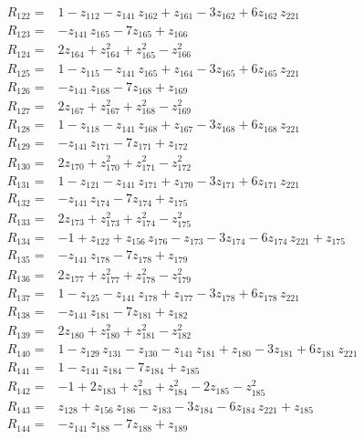 \documentclass[11pt]{article}
\theoremstyle{remark}\newtheorem{remark}[theorem]{Remark}
\begin{document}
\begin{align*}
R_{122}={}& 1 - z_{112} - z_{141}\,z_{162} + z_{161} - 3z_{162} + 6z_{162}\,z_{221} \\[2pt]
R_{123}={}& -z_{141}\,z_{165} - 7z_{165} + z_{166} \\[2pt]
R_{124}={}& 2z_{164} + z_{164}^{2} + z_{165}^{2} - z_{166}^{2} \\[2pt]
R_{125}={}& 1 - z_{115} - z_{141}\,z_{165} + z_{164} - 3z_{165} + 6z_{165}\,z_{221} \\[2pt]
R_{126}={}& -z_{141}\,z_{168} - 7z_{168} + z_{169} \\[2pt]
R_{127}={}& 2z_{167} + z_{167}^{2} + z_{168}^{2} - z_{169}^{2} \\[2pt]
R_{128}={}& 1 - z_{118} - z_{141}\,z_{168} + z_{167} - 3z_{168} + 6z_{168}\,z_{221} \\[2pt]
R_{129}={}& -z_{141}\,z_{171} - 7z_{171} + z_{172} \\[2pt]
R_{130}={}& 2z_{170} + z_{170}^{2} + z_{171}^{2} - z_{172}^{2} \\[2pt]
R_{131}={}& 1 - z_{121} - z_{141}\,z_{171} + z_{170} - 3z_{171} + 6z_{171}\,z_{221} \\[2pt]
R_{132}={}& -z_{141}\,z_{174} - 7z_{174} + z_{175} \\[2pt]
R_{133}={}& 2z_{173} + z_{173}^{2} + z_{174}^{2} - z_{175}^{2} \\[2pt]
R_{134}={}& -1 + z_{122} + z_{156}\,z_{176} - z_{173} - 3z_{174} - 6z_{174}\,z_{221} + z_{175} \\[2pt]
R_{135}={}& -z_{141}\,z_{178} - 7z_{178} + z_{179} \\[2pt]
R_{136}={}& 2z_{177} + z_{177}^{2} + z_{178}^{2} - z_{179}^{2} \\[2pt]
R_{137}={}& 1 - z_{125} - z_{141}\,z_{178} + z_{177} - 3z_{178} + 6z_{178}\,z_{221} \\[2pt]
R_{138}={}& -z_{141}\,z_{181} - 7z_{181} + z_{182} \\[2pt]
R_{139}={}& 2z_{180} + z_{180}^{2} + z_{181}^{2} - z_{182}^{2} \\[2pt]
R_{140}={}& 1 - z_{129}\,z_{131} - z_{130} - z_{141}\,z_{181} + z_{180} - 3z_{181} + 6z_{181}\,z_{221} \\[2pt]
R_{141}={}& 1 - z_{141}\,z_{184} - 7z_{184} + z_{185} \\[2pt]
R_{142}={}& -1 + 2z_{183} + z_{183}^{2} + z_{184}^{2} - 2z_{185} - z_{185}^{2} \\[2pt]
R_{143}={}& z_{128} + z_{156}\,z_{186} - z_{183} - 3z_{184} - 6z_{184}\,z_{221} + z_{185} \\[2pt]
R_{144}={}& -z_{141}\,z_{188} - 7z_{188} + z_{189} \\[2pt]

\end{align*}
\end{document}
